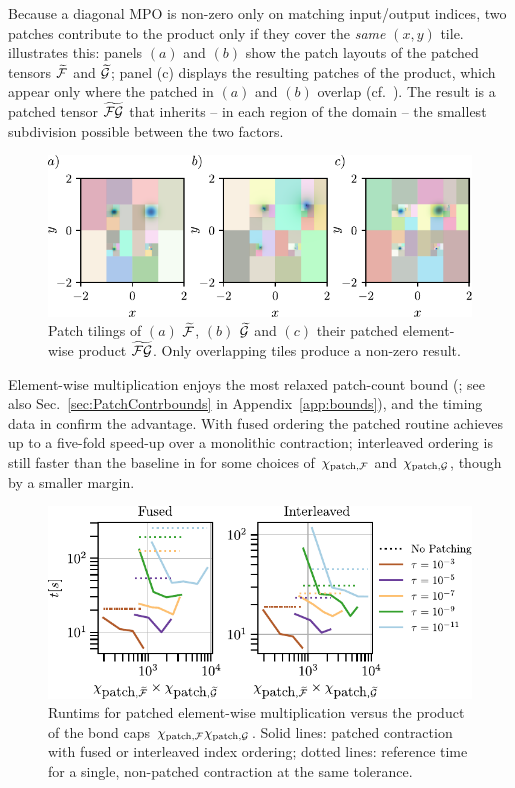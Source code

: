 Because a diagonal MPO is non-zero only on matching input/output indices, two patches contribute to the product only if they cover the \emph{same} \((x,y)\) tile.  
 illustrates this: panels $(a)$ and $(b)$ show the patch layouts of the patched tensors \(\widetilde{\mathcal{F}}\) and
\(\widetilde{\mathcal{G}}\); panel (c) displays the resulting patches of the product, which appear only where the patched in $(a)$ and $(b)$ overlap (cf.\
). The result is a patched tensor \(\widetilde{\mathcal{F}\mathcal{G}}\) that inherits -- in each region of the domain -- the smallest subdivision possible between the two factors.
\begin{figure}[htbp]
    \centering
    \includegraphics{figures/ElemmulResults.pdf}
    \caption{Patch tilings of $(a)$ \(\widetilde{\mathcal{F}}\), $(b)$ \(\widetilde{\mathcal{G}}\) and $(c)$ their patched element-wise product \(\widetilde{\mathcal{F}\mathcal{G}}\). Only overlapping tiles produce a non-zero result.}
    \label{fig:patchingPatternsElemMul}
\end{figure}

Element-wise multiplication enjoys the most relaxed patch-count bound (; see also
Sec.~\ref{sec:PatchContrbounds} in Appendix~\ref{app:bounds}), and the timing
data in \prettyref{fig:elemMulResults} confirm the advantage. With fused ordering the patched routine achieves up to a five-fold speed-up
over a monolithic contraction; interleaved ordering is still faster than the baseline in for some choices of $\chi_{\text{patch},\mathcal{F}}$ and $\chi_{\text{patch},\mathcal{G}}$, though by a smaller margin.



\begin{figure}[ht!]
    \centering
    \includegraphics{figures/elemmulTimeResults.pdf}
    \caption{Runtims for patched element-wise multiplication versus the product of the bond caps \(\chi_{\text{patch},\mathcal{F}}\chi_{\text{patch},\mathcal{G}}\). Solid lines: patched contraction with fused or interleaved index ordering; dotted lines: reference time for a single, non-patched contraction at the same tolerance. }
    \label{fig:elemMulResults}
\end{figure}

